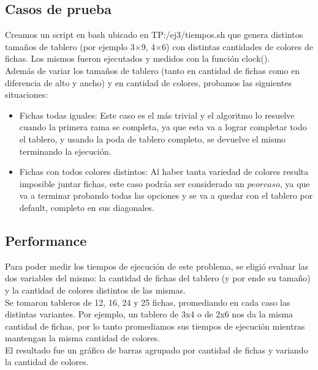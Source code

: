\newpage

\subsection{Casos de prueba}

Creamos un script en bash ubicado en TP:/ej3/tiempos.sh que genera distintos tama\~nos de tablero (por ejemplo 3$\times$9, 4$\times$6) con distintas cantidades de colores de fichas. Los mismos fueron ejecutados y medidos con la funci\'on clock(). \\

Adem\'as de variar los tama\~nos de tablero (tanto en cantidad de fichas como en diferencia de alto y ancho) y en cantidad de colores, probamos las siguientes situaciones:\\

\begin{itemize}
\item Fichas todas iguales: Este caso es el m\'as trivial y el algoritmo lo resuelve cuando la primera rama se completa, ya que esta va a lograr completar todo el tablero, y usando la poda de tablero completo, se devuelve el mismo terminando la ejecuci\'on.
\item Fichas con todos colores distintos: Al haber tanta variedad de colores resulta imposible juntar fichas, este caso podr\'aa ser considerado un $peor caso$, ya que va a terminar probando todas las opciones y se va a quedar con el tablero por default, completo en sus diagonales.
\end{itemize}

\subsection{Performance}

Para poder medir los tiempos de ejecuci\'on de este problema, se eligi\'o evaluar las dos variables del mismo: la cantidad de fichas del tablero (y por ende su tama\~no) y la cantidad de colores distintos de las mismas. \\

Se tomaron tableros de 12, 16, 24 y 25 fichas, promediando en cada caso las distintas variantes. Por ejemplo, un tablero de 3x4 o de 2x6 nos da la misma cantidad de fichas, por lo tanto promediamos sus tiempos de ejecuci\'on mientras mantengan la misma cantidad de colores. \\

El resultado fue un gr\'afico de barras agrupado por cantidad de fichas y variando la cantidad de colores.

